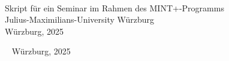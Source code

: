 \begin{titlepage}
  \centering\large
  ~
  \vfill  
  \textcolor{Maroon}{\Huge{}} \\ \medskip
  \vfill
  \vspace{5cm}
  \vfill
  Skript für ein Seminar im Rahmen des MINT+-Programms\\
  Julius-Maximilians-University Würzburg\\
  Würzburg, 2025
  \vfill
\end{titlepage}

\thispagestyle{empty}%
~%
\vfill%
\noindent Würzburg, 2025
\cleardoublepage

